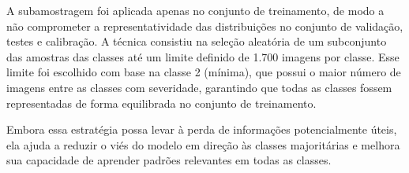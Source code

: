 A subamostragem foi aplicada apenas no conjunto de treinamento, de modo a não comprometer a representatividade das distribuições no conjunto de validação, testes e calibração. A técnica consistiu na seleção aleatória de um subconjunto das amostras das classes até um limite definido de 1.700 imagens por classe. Esse limite foi escolhido com base na classe 2 (mínima), que possui o maior número de imagens entre as classes com severidade, garantindo que todas as classes fossem representadas de forma equilibrada no conjunto de treinamento.

Embora essa estratégia possa levar à perda de informações potencialmente úteis, ela ajuda a reduzir o viés do modelo em direção às classes majoritárias e melhora sua capacidade de aprender padrões relevantes em todas as classes.